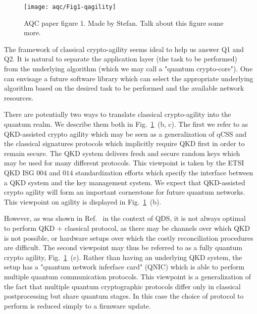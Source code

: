 \begin{figure}[htp]
\centering
\texttt{[image: aqc/Fig1-qagility]}
\caption{\label{fig:agility} AQC paper figure 1. Made by Stefan. Talk about this figure some more.}
\end{figure}

The framework of classical crypto-agility seems ideal to help us answer Q1 and Q2. It is natural to separate the application layer (the task to be performed) from the underlying algorithm (which we may call a "quantum crypto-core"). One can envisage a future software library which can select the appropriate underlying algorithm based on the desired task to be performed and the available network resources.



There are potentially two ways to translate classical crypto-agility into the quantum realm. We describe them both in Fig.~\ref{fig:agility}~(b, c). The first we refer to as QKD-assisted crypto agility which may be seen as a generalization of qCSS and the classical signatures protocols  which implicitly require QKD first in order to remain secure. The QKD system delivers fresh and secure random keys which may be used for many different protocols. This viewpoint is taken by the ETSI QKD ISG $004$ and $014$ standardization efforts  which specify the interface between a QKD system and the key management system. We expect that QKD-assisted crypto agility will form an important cornerstone for future quantum networks. This viewpoint on agility is displayed in Fig.~\ref{fig:agility}~(b).

However, as was shown in Ref.~\cite{Amiri2016} in the context of QDS, it is not always optimal to perform QKD + classical protocol, as there may be channels over which QKD is not possible, or hardware setups over which the costly reconciliation procedures are difficult. The second viewpoint may thus be referred to as a fully quantum crypto agility, Fig.~\ref{fig:agility}~(c). Rather than having an underlying QKD system, the setup has a "quantum network inferface card" (QNIC) which is able to perform multiple quantum communication protocols. This viewpoint is a generalization of the fact that multiple quantum cryptographic protocols differ only in classical postprocessing but share quantum stages. In this case the choice of protocol to perform is reduced simply to a firmware update. 

